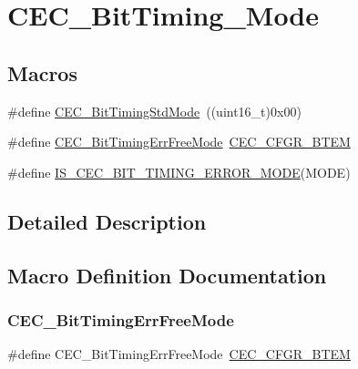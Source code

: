 \hypertarget{group___c_e_c___bit_timing___mode}{}\section{C\+E\+C\+\_\+\+Bit\+Timing\+\_\+\+Mode}
\label{group___c_e_c___bit_timing___mode}
\subsection*{Macros}
\begin{DoxyCompactItemize}
\item 
\#define \mbox{\hyperlink{group___c_e_c___bit_timing___mode_gaf6866e5087bb01c1ea4e20a207a1f691}{C\+E\+C\+\_\+\+Bit\+Timing\+Std\+Mode}}~((uint16\+\_\+t)0x00)
\item 
\#define \mbox{\hyperlink{group___c_e_c___bit_timing___mode_ga4fd44675c774985d1f6cd8976b18c947}{C\+E\+C\+\_\+\+Bit\+Timing\+Err\+Free\+Mode}}~\mbox{\hyperlink{group___peripheral___registers___bits___definition_ga8b06cd4e47f4235d8880e1ba0e56e2d7}{C\+E\+C\+\_\+\+C\+F\+G\+R\+\_\+\+B\+T\+EM}}
\item 
\#define \mbox{\hyperlink{group___c_e_c___bit_timing___mode_ga55494269b2c9c55c11130a429f418a8d}{I\+S\+\_\+\+C\+E\+C\+\_\+\+B\+I\+T\+\_\+\+T\+I\+M\+I\+N\+G\+\_\+\+E\+R\+R\+O\+R\+\_\+\+M\+O\+DE}}(M\+O\+DE)
\end{DoxyCompactItemize}


\subsection{Detailed Description}


\subsection{Macro Definition Documentation}
\mbox{\label{group___c_e_c___bit_timing___mode_ga4fd44675c774985d1f6cd8976b18c947}} 
\subsubsection{\texorpdfstring{CEC\_BitTimingErrFreeMode}{CEC\_BitTimingErrFreeMode}}
{\footnotesize\ttfamily \#define C\+E\+C\+\_\+\+Bit\+Timing\+Err\+Free\+Mode~\mbox{\hyperlink{group___peripheral___registers___bits___definition_ga8b06cd4e47f4235d8880e1ba0e56e2d7}{C\+E\+C\+\_\+\+C\+F\+G\+R\+\_\+\+B\+T\+EM}}}

